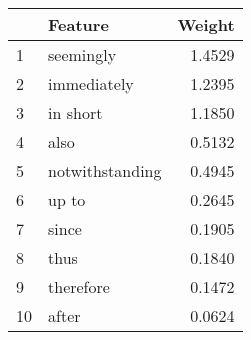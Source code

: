 \begin{tabular}{llr}
\toprule
{} &          Feature &  Weight \\
\midrule
1  &        seemingly &  1.4529 \\
2  &      immediately &  1.2395 \\
3  &         in short &  1.1850 \\
4  &             also &  0.5132 \\
5  &  notwithstanding &  0.4945 \\
6  &            up to &  0.2645 \\
7  &            since &  0.1905 \\
8  &             thus &  0.1840 \\
9  &        therefore &  0.1472 \\
10 &            after &  0.0624 \\
\bottomrule
\end{tabular}
